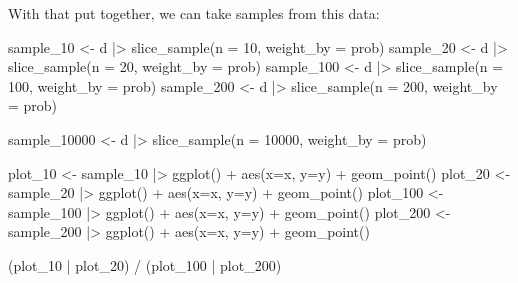 \documentclass[
  letterpaper,
  DIV=11,
  numbers=noendperiod]{scrreprt}
\newenvironment{Shaded}{\begin{snugshade}}{\end{snugshade}}
\newcommand{\AttributeTok}[1]{\textcolor[rgb]{0.40,0.45,0.13}{#1}}
\newcommand{\DecValTok}[1]{\textcolor[rgb]{0.68,0.00,0.00}{#1}}
\newcommand{\FunctionTok}[1]{\textcolor[rgb]{0.28,0.35,0.67}{#1}}
\newcommand{\NormalTok}[1]{\textcolor[rgb]{0.00,0.23,0.31}{#1}}
\newcommand{\OtherTok}[1]{\textcolor[rgb]{0.00,0.23,0.31}{#1}}
\newcommand{\SpecialCharTok}[1]{\textcolor[rgb]{0.37,0.37,0.37}{#1}}
\begin{document}
With that put together, we can take samples from this data:

\begin{Shaded}
\begin{Highlighting}[]
\NormalTok{sample\_10  }\OtherTok{\textless{}{-}}\NormalTok{ d }\SpecialCharTok{|\textgreater{}} \FunctionTok{slice\_sample}\NormalTok{(}\AttributeTok{n =} \DecValTok{10}\NormalTok{, }\AttributeTok{weight\_by =}\NormalTok{ prob)}
\NormalTok{sample\_20  }\OtherTok{\textless{}{-}}\NormalTok{ d }\SpecialCharTok{|\textgreater{}} \FunctionTok{slice\_sample}\NormalTok{(}\AttributeTok{n =} \DecValTok{20}\NormalTok{, }\AttributeTok{weight\_by =}\NormalTok{ prob)}
\NormalTok{sample\_100 }\OtherTok{\textless{}{-}}\NormalTok{ d }\SpecialCharTok{|\textgreater{}} \FunctionTok{slice\_sample}\NormalTok{(}\AttributeTok{n =} \DecValTok{100}\NormalTok{, }\AttributeTok{weight\_by =}\NormalTok{ prob)}
\NormalTok{sample\_200 }\OtherTok{\textless{}{-}}\NormalTok{ d }\SpecialCharTok{|\textgreater{}} \FunctionTok{slice\_sample}\NormalTok{(}\AttributeTok{n =} \DecValTok{200}\NormalTok{, }\AttributeTok{weight\_by =}\NormalTok{ prob)}

\NormalTok{sample\_10000 }\OtherTok{\textless{}{-}}\NormalTok{ d }\SpecialCharTok{|\textgreater{}} \FunctionTok{slice\_sample}\NormalTok{(}\AttributeTok{n =} \DecValTok{10000}\NormalTok{, }\AttributeTok{weight\_by =}\NormalTok{ prob)}
\end{Highlighting}
\end{Shaded}

\begin{Shaded}
\begin{Highlighting}[]
\NormalTok{plot\_10 }\OtherTok{\textless{}{-}} 
\NormalTok{  sample\_10 }\SpecialCharTok{|\textgreater{}} 
    \FunctionTok{ggplot}\NormalTok{() }\SpecialCharTok{+} 
    \FunctionTok{aes}\NormalTok{(}\AttributeTok{x=}\NormalTok{x, }\AttributeTok{y=}\NormalTok{y) }\SpecialCharTok{+} 
    \FunctionTok{geom\_point}\NormalTok{()}
\NormalTok{plot\_20 }\OtherTok{\textless{}{-}} 
\NormalTok{  sample\_20 }\SpecialCharTok{|\textgreater{}} 
    \FunctionTok{ggplot}\NormalTok{() }\SpecialCharTok{+} 
    \FunctionTok{aes}\NormalTok{(}\AttributeTok{x=}\NormalTok{x, }\AttributeTok{y=}\NormalTok{y) }\SpecialCharTok{+} 
    \FunctionTok{geom\_point}\NormalTok{()}
\NormalTok{plot\_100 }\OtherTok{\textless{}{-}} 
\NormalTok{  sample\_100 }\SpecialCharTok{|\textgreater{}} 
    \FunctionTok{ggplot}\NormalTok{() }\SpecialCharTok{+} 
    \FunctionTok{aes}\NormalTok{(}\AttributeTok{x=}\NormalTok{x, }\AttributeTok{y=}\NormalTok{y) }\SpecialCharTok{+} 
    \FunctionTok{geom\_point}\NormalTok{()}
\NormalTok{plot\_200 }\OtherTok{\textless{}{-}} 
\NormalTok{  sample\_200 }\SpecialCharTok{|\textgreater{}} 
    \FunctionTok{ggplot}\NormalTok{() }\SpecialCharTok{+} 
    \FunctionTok{aes}\NormalTok{(}\AttributeTok{x=}\NormalTok{x, }\AttributeTok{y=}\NormalTok{y) }\SpecialCharTok{+} 
    \FunctionTok{geom\_point}\NormalTok{()}

\NormalTok{(plot\_10 }\SpecialCharTok{|}\NormalTok{ plot\_20) }\SpecialCharTok{/} 
\NormalTok{  (plot\_100 }\SpecialCharTok{|}\NormalTok{ plot\_200)}
\end{Highlighting}
\end{Shaded}
\end{document}

